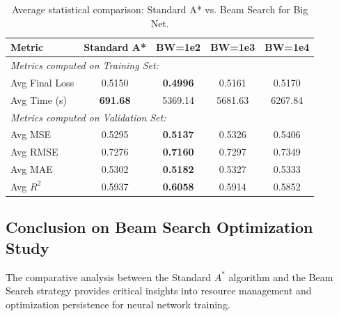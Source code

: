\begin{table}[h]
\centering
\scriptsize
\begin{tabular}{|l|c|c|c|c|}
\hline
\textbf{Metric} & \textbf{Standard A*} & \textbf{BW=1e2} & \textbf{BW=1e3} & \textbf{BW=1e4} \\ \hline
\multicolumn{5}{|l|}{\textit{Metrics computed on Training Set:}} \\ \hline
Avg Final Loss        & 0.5150               & \textbf{0.4996}          & 0.5161          & 0.5170          \\ \hline
Avg Time (s)          & \textbf{691.68}               & 5369.14         & 5681.63         & 6267.84         \\ \hline
\multicolumn{5}{|l|}{\textit{Metrics computed on Validation Set:}} \\ \hline
Avg MSE               & 0.5295               & \textbf{0.5137}          & 0.5326          & 0.5406          \\ \hline
Avg RMSE              & 0.7276               & \textbf{0.7160}          & 0.7297          & 0.7349          \\ \hline
Avg MAE               & 0.5302               & \textbf{0.5182}          & 0.5327          & 0.5333          \\ \hline
Avg $R^2$             & 0.5937               & \textbf{0.6058}          & 0.5914          & 0.5852          \\ \hline
\end{tabular}
\caption{Average statistical comparison: Standard A* vs. Beam Search for Big Net.}
\label{tab:big_net_bs_results}
\end{table}

\newpage

\subsection{Conclusion on Beam Search Optimization Study}

The comparative analysis between the Standard $A^*$ algorithm and the Beam Search strategy provides critical insights into resource management and optimization persistence for neural network training.

